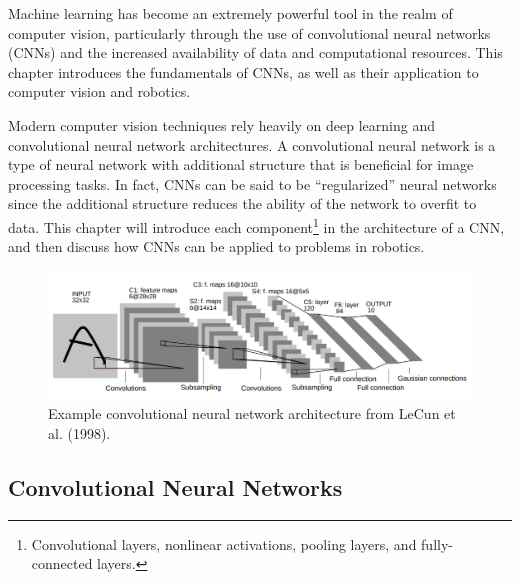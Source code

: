 Machine learning has become an extremely powerful tool in the realm of computer vision, particularly through the use of convolutional neural networks (CNNs) and the increased availability of data and computational resources. This chapter introduces the fundamentals of CNNs, as well as their application to computer vision and robotics.

Modern computer vision techniques\cite{ForsythPonce2011} rely heavily on deep learning and convolutional neural network architectures\cite{GoodfellowBengioEtAl2016}. A convolutional neural network is a type of neural network with additional structure that is beneficial for image processing tasks. In fact, CNNs can be said to be ``regularized'' neural networks since the additional structure reduces the ability of the network to overfit to data.
This chapter will introduce each component\footnote{Convolutional layers, nonlinear activations, pooling layers, and fully-connected layers.} in the architecture of a CNN, and then discuss how CNNs can be applied to problems in robotics.

\begin{figure}[ht] 
\begin{center}
\includegraphics[width=\textwidth]{tex/figs/ch12_figs/lecun.png}
\caption{Example convolutional neural network architecture from LeCun et al. (1998)\nocite{LecunBottouEtAl1998}.}
\label{fig:activations}
\end{center}
\end{figure}

\subsection{Convolutional Neural Networks}

